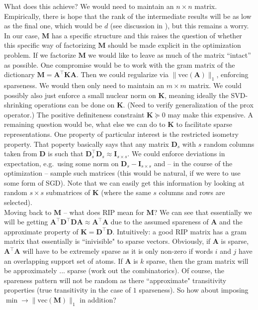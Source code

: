 \documentclass{article}
\newcommand{\mM}{{\mathbf M}}
\newcommand{\mK}{{\mathbf K}}
\newcommand{\mD}{{\mathbf D}}
\newcommand{\mA}{{\mathbf A}}
\newcommand{\textred}[1]{{\color{Red} #1}}
\begin{document}
What does this achieve? We would need to maintain an $n \times n$ matrix. Empirically, there is hope that the rank of the intermediate results will be as low as the final one, which would be $d$ (see discussion in \cite{cai2010singular}), but this remains a worry. In our case, $\mM$ has a specific structure and this raises the question of whether this specific way of factorizing $\mM$ should be made explicit in the optimization problem. If we factorize $\mM$ we would like to leave as much of the matrix ``intact'' as possible. One compromise would be to work with the gram matrix of the dictionary $\mM = \mA^\top \mK \mA$. Then we could regularize via $\| \text{vec}(\mA) \|_1$, enforcing sparseness. We would then only need to maintain an $m \times m$ matrix. We could possibly also just enforce a small nuclear  norm on $\mK$, meaning ideally the SVD-shrinking operations can be done on $\mK$. (Need to verify generalization of the prox operator.) The positive definiteness constraint $\mK \succeq 0$ may make this expensive. A remaining question would be, what else we can do to $\mK$ to facilitate sparse representations. One property of particular interest is the \textred{restricted isometry property}. That poperty basically says that any matrix $\mD_s$ with $s$ random columns taken from $\mD$ is such that $\mD_s^\top \mD_s \approx \mathbf I_{s \times s}$. We could enforce deviations in expectation, e.g.~using some norm on $\mD_s - \mathbf I_{s \times s}$  and -- in the course of the optimization -- sample such matrices (this would be natural, if  we were to use some form of SGD). Note that we can easily get this information by looking at random $s \times s$ submatrices of $\mK$ (where the same $s$ columns and rows are selected). \\

Moving back to $\mM$ -- what does RIP mean for $\mM$? We can see that essentially we will be getting $\mA^\top \mD^\top \mD \mA \approx \mA^\top \mA$ due to the assumed spareness of $\mA$ and the approximate property of $\mK = \mD^\top \mD$.  Intuitively: a good RIP matrix has a gram matrix that essentially is ``inivisible" to sparse vectors. Obviously, if $\mA$ is sparse, $\mA^\top\mA$ will have to be extremely sparse as it is only non-zero if words $i$ and $j$ have an overlapping support set of atoms. If $\mA$ is $k$ sparse, then the gram matrix will be approximately ... sparse (work out the combinatorics). Of course, the spareness pattern will not be random as there ``approximate" transitivity properties (true transitivity in the case of $1$ sparseness). So how about imposing $\min \rightarrow \|\text{vec}(\mM)\|_1$ in addition?
\\
\end{document}
